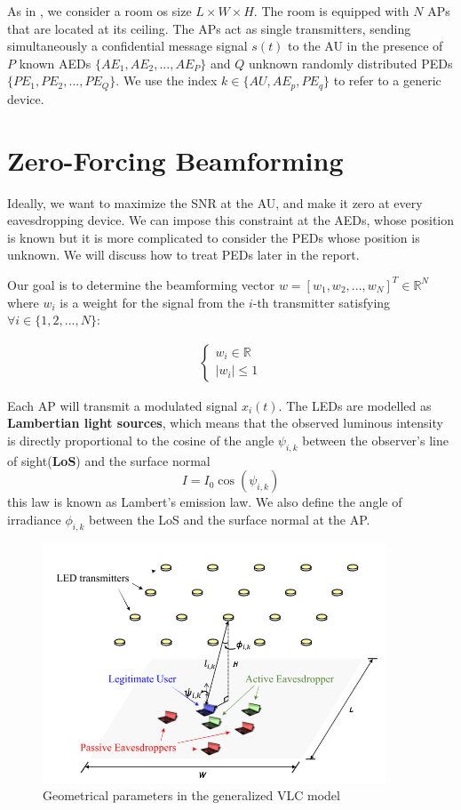 \documentclass[a4paper,12pt,twoside]{article}
\begin{document}
	As in \cite{Edinburgh2020}, we consider a room os size $L \times W \times H$. The room is equipped with $N$ APs that are located at its ceiling. The APs act as single transmitters, sending simultaneously a confidential message signal $s(t)$ to the AU in the presence of $P$ known AEDs $\{ AE_1, AE_2, ..., AE_P \}$ and $Q$ unknown randomly distributed PEDs $\{ PE_1, PE_2, ..., PE_Q \}$. We use the index $k \in \{AU, AE_p, PE_q\}$ to refer to a generic device.
	
	\section{Zero-Forcing Beamforming}
	
	Ideally, we want to maximize the SNR at the AU, and make it zero at every eavesdropping device. We can impose this constraint at the AEDs, whose position is known but it is more complicated to consider the PEDs whose position is unknown. We will discuss how to treat PEDs later in the report.
	
	Our goal is to determine the beamforming vector $w = [w_1,w_2,...,w_N]^T \in \mathbb{R}^N$ where $w_i$ is a weight for the signal from the $i$-th transmitter satisfying $\forall i \in \{1,2,...,N\}$:
	
	\begin{align}
		\begin{cases}
			w_i \in \mathbb{R} \\
			|w_i| \leq 1
		\end{cases}
	\end{align}
	
	Each AP will transmit a modulated signal $x_i(t)$. The LEDs are modelled as \textbf{Lambertian light sources}, which means that the observed luminous intensity is directly proportional to the cosine of the angle  $\psi_{i,k}$ between the observer's line of sight(\textbf{LoS}) and the surface normal
	\begin{equation}
		I = I_0 \cos( \psi_{i,k})
	\end{equation}
	this law is known as Lambert's emission law. We also define the angle of irradiance $\phi_{i,k}$ between the LoS and the surface normal at the AP.
	
	\begin{figure}[h!]
		\centering
		\includegraphics[scale=0.8]{../geometry.PNG}
		\caption{Geometrical parameters in the generalized VLC model \cite{Oxford2021}}
	\end{figure}
	
\end{document}
